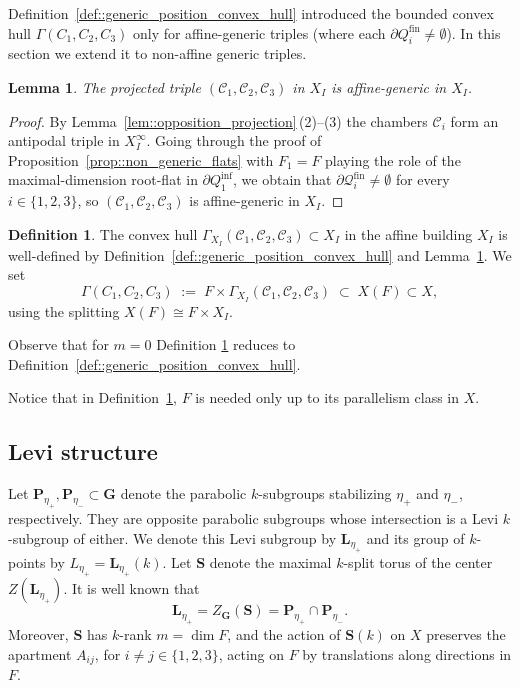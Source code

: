 \documentclass[11pt]{amsart}
\theoremstyle{plain}
\newtheorem{lem}[thm]{Lemma}
\theoremstyle{definition}
\newtheorem{Def}[thm]{Definition}
\theoremstyle{remark}
\begin{document}
	Definition~\ref{def::generic_position_convex_hull} introduced the bounded convex hull $\Gamma(C_1,C_2,C_3)$ only for affine-generic triples (where each $\partial Q_i^{\mathrm{fin}}\ne\emptyset$). In this section we extend it to non-affine generic triples. 
	
	\begin{lem}\label{lem:hull}
		The projected triple $(\mathcal C_1,\mathcal C_2,\mathcal C_3)$ in $X_I$ is affine-generic in $X_I$. 
	\end{lem}
	
	
	\begin{proof}
		By Lemma~\ref{lem::opposition_projection}\,(2)--(3) the chambers $\mathcal C_i$ form an antipodal triple in $X_I^\infty$. Going through the proof of Proposition~\ref{prop::non_generic_flats} with $F_1=F$ playing the role of the maximal-dimension root-flat in $\partial Q_1^{\mathrm{inf}}$, we obtain that $\partial\mathcal{Q}_i^{\mathrm{fin}}\ne\emptyset$ for every $i\in\{1,2,3\}$, so $(\mathcal C_1,\mathcal C_2,\mathcal C_3)$ is affine-generic in $X_I$. 
	\end{proof}
	
	\begin{Def}\label{def:hull_extended}
		The convex hull $\Gamma_{X_I}(\mathcal C_1,\mathcal C_2,\mathcal C_3)\subset X_I$ in the affine building $X_I$ is well-defined by Definition~\ref{def::generic_position_convex_hull} and Lemma~\ref{lem:hull}. We set
		\[
		\Gamma(C_1,C_2,C_3) \;:=\; F\times\Gamma_{X_I}(\mathcal C_1,\mathcal C_2,\mathcal C_3) \;\subset\; X(F)\subset X,\]
		using the splitting $X(F)\cong F\times X_I$.
	\end{Def}
	
	Observe that for $m=0$ Definition \ref{def:hull_extended} reduces to Definition~\ref{def::generic_position_convex_hull}.
	
Notice that in Definition~\ref{def:hull_extended}, \(F\) is needed only up to its parallelism class in \(X\).
	
	\subsection{Levi structure}
		
	Let $\mathbf{P}_{\eta_+}, \mathbf{P}_{\eta_-} \subset \mathbf{G}$ denote the parabolic $k$-subgroups stabilizing $\eta_+$ and $\eta_-$, respectively. They are opposite parabolic subgroups whose intersection is a Levi $k$-subgroup of either. We denote this Levi subgroup by $\mathbf{L}_{\eta_+}$ and its group of $k$-points by $L_{\eta_+} = \mathbf{L}_{\eta_+}(k)$. Let $\mathbf{S}$ denote the maximal $k$-split torus of the center $Z(\mathbf{L}_{\eta_+})$. It is well known that
\[
\mathbf{L}_{\eta_+} = Z_{\mathbf{G}}(\mathbf{S}) = \mathbf{P}_{\eta_+} \cap \mathbf{P}_{\eta_-}.
\]
Moreover, $\mathbf{S}$ has $k$-rank $m = \dim F$, and the action of $\mathbf{S}(k)$ on $X$ preserves the apartment $A_{ij}$, for $i\neq j \in \{1,2,3\}$, acting on $F$ by translations along directions in $F$.
\end{document}
